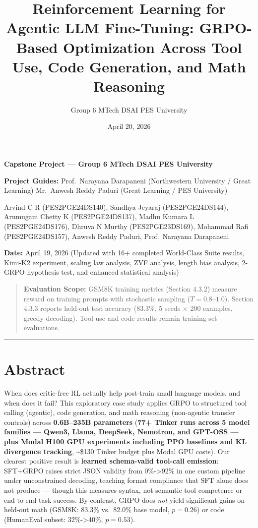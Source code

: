 \documentclass[
  american,
  11pt,
  a4paper,
  oneside]{report}
\title{Reinforcement Learning for Agentic LLM Fine-Tuning: GRPO-Based
Optimization Across Tool Use, Code Generation, and Math Reasoning}
\author{Group 6 \textbar{} MTech DSAI \textbar{} PES University}
\date{April 20, 2026}
\begin{document}
\maketitle

{
\setcounter{tocdepth}{2}
\tableofcontents
}
\textbf{Capstone Project --- Group 6 \textbar{} MTech DSAI \textbar{}
PES University}

\textbf{Project Guides:} Prof.~Narayana Darapaneni (Northwestern
University / Great Learning) \textbar{} Mr.~Anwesh Reddy Paduri (Great
Learning / PES University)

Arvind C R (PES2PGE24DS140), Sandhya Jeyaraj (PES2PGE24DS144), Arumugam
Chetty K (PES2PGE24DS137), Madhu Kumara L (PES2PGE24DS176), Dhruva N
Murthy (PES2PGE23DS169), Mohammad Rafi (PES2PGE24DS157), Anwesh Reddy
Paduri, Prof.~Narayana Darapaneni

\textbf{Date:} April 19, 2026 (Updated with 16+ completed World-Class
Suite results, Kimi-K2 experiment, scaling law analysis, ZVF analysis,
length bias analysis, 2-GRPO hypothesis test, and enhanced statistical
analysis)

\begin{quote}
\textbf{Evaluation Scope:} GSM8K training metrics (Section 4.3.2)
measure reward on training prompts with stochastic sampling
(\(T{=}0.8\)--\(1.0\)). Section 4.3.3 reports held-out test accuracy
(83.3\%, 5 seeds × 200 examples, greedy decoding). Tool-use and code
results remain training-set evaluations.
\end{quote}

\begin{center}\rule{0.5\linewidth}{0.5pt}\end{center}

\chapter{Abstract}\label{abstract}

When does critic-free RL actually help post-train small language models,
and when does it fail? This exploratory case study applies GRPO to
structured tool calling (agentic), code generation, and math reasoning
(non-agentic transfer controls) across \textbf{0.6B--235B parameters}
(\textbf{77+ Tinker runs across 5 model families --- Qwen3, Llama,
DeepSeek, Nemotron, and GPT-OSS --- plus Modal H100 GPU experiments
including PPO baselines and KL divergence tracking},
\textasciitilde\$130 Tinker budget plus Modal GPU costs). Our clearest
positive result is \textbf{learned schema-valid tool-call emission}:
SFT+GRPO raises strict JSON validity from 0\%-\textgreater92\% in one
custom pipeline under unconstrained decoding, teaching format compliance
that SFT alone does not produce --- though this measures syntax, not
semantic tool competence or end-to-end task success. By contrast, GRPO
does \emph{not} yield significant gains on held-out math (GSM8K: 83.3\%
vs.~82.0\% base model, \(p{=}0.26\)) or code (HumanEval subset:
32\%-\textgreater40\%, \(p{=}0.53\)).
\end{document}
